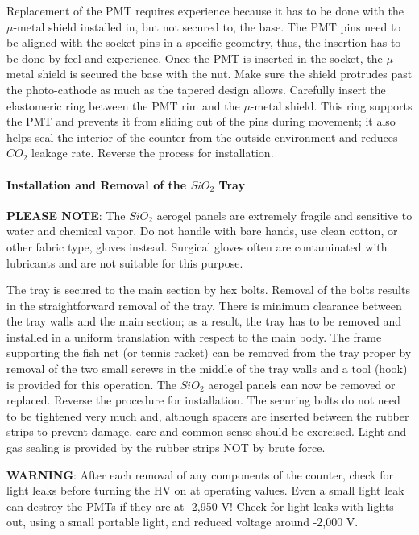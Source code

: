 {Replacement of the PMT requires experience because it has to be done with the
$\mu$-metal shield installed in, but not secured to, the base. The PMT pins
need to be aligned with the socket pins in a specific geometry, thus, the
insertion has to be done by feel and experience. Once the PMT is inserted in
the socket, the $\mu$-metal shield is secured the base with the nut. Make sure
the shield protrudes past the photo-cathode as much as the tapered design
allows. Carefully insert the elastomeric ring between the PMT rim and the
$\mu$-metal shield. This ring supports the PMT and prevents it from sliding 
out of the pins during movement; it also helps seal the interior of the counter
from the outside environment and reduces $CO_2$ leakage rate. 
Reverse the process for installation.

\paragraph{Installation and Removal of the $SiO_2$ Tray}

{\bf PLEASE NOTE}: The $SiO_2$ aerogel panels are extremely fragile and sensitive to 
water and chemical vapor. Do not handle with bare hands, use clean cotton, or 
other fabric type, gloves instead. Surgical gloves often are contaminated with 
lubricants and are not suitable for this purpose. 

The tray is secured to the main section by hex bolts. Removal of the bolts 
results in the straightforward removal of the tray. There is minimum clearance 
between the tray walls and the main section; as a result, the tray has to 
be removed and installed in a uniform translation with respect to the main 
body. The frame supporting the fish net (or tennis racket) can be removed from 
the tray proper by removal of the two small screws in the middle of the tray 
walls and a tool (hook) is provided for this operation. The $SiO_2$ aerogel 
panels can now be removed or replaced. Reverse the procedure for installation.
The securing bolts do not need to be tightened very much and, although spacers 
are inserted between the rubber strips to prevent damage, care and common sense 
 should be exercised. Light and gas sealing is provided by the 
rubber strips NOT by brute force.

{\bf WARNING}: After each removal of any components of the counter, check for light 
leaks before turning the HV on at operating values. Even a small light 
leak can destroy the PMTs if they are at -2,950 V! Check for light leaks with 
lights out, using a small portable light, and reduced voltage around -2,000 V.

}
